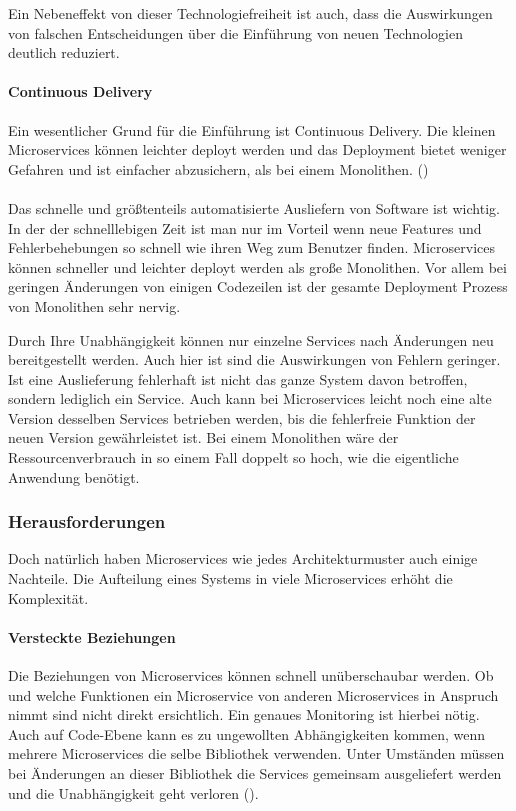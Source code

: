 Ein Nebeneffekt von dieser Technologiefreiheit ist auch, dass die Auswirkungen von falschen Entscheidungen über die Einführung von neuen Technologien deutlich reduziert. 


\paragraph{Continuous Delivery}

Ein wesentlicher Grund für die Einführung ist Continuous Delivery. Die kleinen Microservices können leichter deployt werden und das Deployment bietet weniger Gefahren und ist einfacher abzusichern, als bei einem Monolithen. (\cite[S. 5]{wolffMicroservices2018}) \\
\\
Das schnelle und größtenteils automatisierte Ausliefern von Software ist wichtig. In der der schnelllebigen Zeit ist man nur im Vorteil wenn neue Features und Fehlerbehebungen so schnell wie ihren Weg zum Benutzer finden. Microservices können schneller und leichter deployt werden als große Monolithen. Vor allem bei geringen Änderungen von einigen Codezeilen ist der gesamte Deployment Prozess von Monolithen sehr nervig.

Durch Ihre Unabhängigkeit können nur einzelne Services nach Änderungen neu bereitgestellt werden. Auch hier ist sind die Auswirkungen von Fehlern geringer. Ist eine Auslieferung fehlerhaft ist nicht das ganze System davon betroffen, sondern lediglich ein Service. Auch kann bei Microservices leicht noch eine alte Version desselben Services betrieben werden, bis die fehlerfreie Funktion der neuen Version gewährleistet ist. Bei einem Monolithen wäre der Ressourcenverbrauch in so einem Fall doppelt so hoch, wie die eigentliche Anwendung benötigt. \\

\subsubsection{Herausforderungen}

Doch natürlich haben Microservices wie jedes Architekturmuster auch einige Nachteile. Die Aufteilung eines Systems in viele Microservices erhöht die Komplexität. 

\paragraph{Versteckte Beziehungen}

Die Beziehungen von Microservices können schnell unüberschaubar werden. Ob und welche Funktionen ein Microservice von anderen Microservices in Anspruch nimmt sind nicht direkt ersichtlich. Ein genaues Monitoring ist hierbei nötig. Auch auf Code-Ebene kann es zu ungewollten Abhängigkeiten kommen, wenn mehrere Microservices die selbe Bibliothek verwenden. Unter Umständen müssen bei Änderungen an dieser Bibliothek die Services gemeinsam ausgeliefert werden und die Unabhängigkeit geht verloren (\cite[S. 75]{wolffMicroservices2018}).

